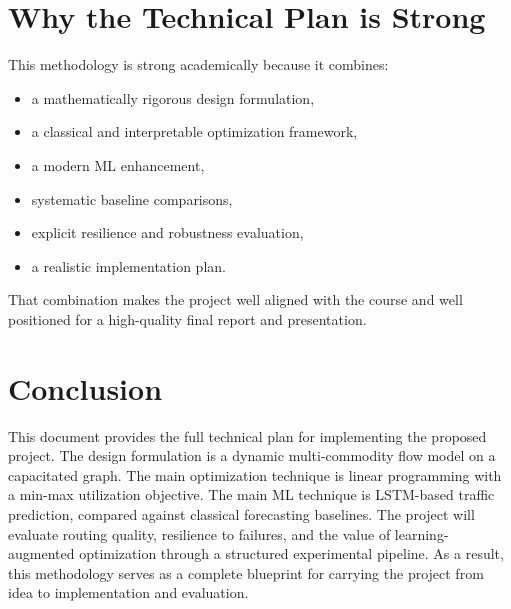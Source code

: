\documentclass[11pt]{article}
\begin{document}
\section{Why the Technical Plan is Strong}
This methodology is strong academically because it combines:
\begin{itemize}
    \item a mathematically rigorous design formulation,
    \item a classical and interpretable optimization framework,
    \item a modern ML enhancement,
    \item systematic baseline comparisons,
    \item explicit resilience and robustness evaluation,
    \item a realistic implementation plan.
\end{itemize}

That combination makes the project well aligned with the course and well positioned for a high-quality final report and presentation.

\section{Conclusion}
This document provides the full technical plan for implementing the proposed project. The design formulation is a dynamic multi-commodity flow model on a capacitated graph. The main optimization technique is linear programming with a min-max utilization objective. The main ML technique is LSTM-based traffic prediction, compared against classical forecasting baselines. The project will evaluate routing quality, resilience to failures, and the value of learning-augmented optimization through a structured experimental pipeline. As a result, this methodology serves as a complete blueprint for carrying the project from idea to implementation and evaluation.
\end{document}
